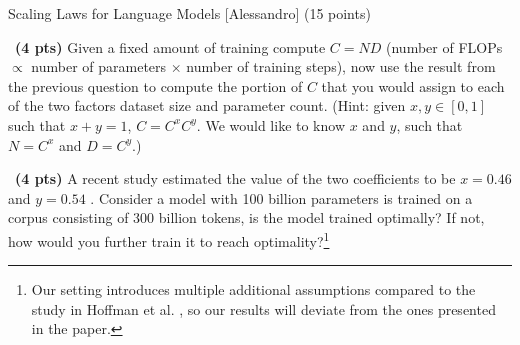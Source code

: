 \begin{question}{Scaling Laws for Language Models  [Alessandro] (15 points)}
\begin{subquestion}{~\small \textbf{(4 pts)}}
    Given a fixed amount of training compute $C = ND$ (number of FLOPs $\propto$ number of parameters $\times$ number of training steps), now use the result from the previous question to compute the portion of $C$ that you would assign to each of the two factors dataset size and parameter count. (Hint: given $x, y \in [0,1]$ such that $x + y = 1$, $C = C^x C^y $. We would like to know $x$ and $y$, such that $N = C^{x}$ and $D = C^{y}$.)

\end{subquestion}

\begin{subquestion}{~\small \textbf{(4 pts)}}
    A recent study estimated the value of the two coefficients to be $x = 0.46$ and $y = 0.54$ \citep{hoffmann2022training}.
    Consider a model with 100 billion parameters is trained on a corpus consisting of 300 billion tokens, is the model trained optimally? If not, how would you further train it to reach optimality?\footnote{Our setting introduces multiple additional assumptions compared to the study in Hoffman et al. \cite{hoffmann2022training}, so our results will deviate from the ones presented in the paper.}


\end{subquestion}
\end{question}
